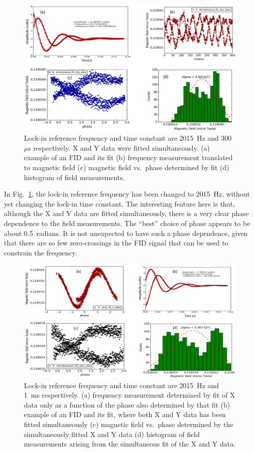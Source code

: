 \begin{figure}%
\centering\includegraphics[width=0.8\linewidth]{figures/freq_2015_simultaneous_fit_300microsec.png}
\caption{Lock-in reference frequency and time constant are 2015~Hz and
  300~$\mu$s respectively.  X and Y data were fitted simultaneously.
  (a) example of an FID and its fit (b) frequency measurement
  translated to magnetic field (c) magnetic field vs.~phase determined
  by fit (d) histogram of field
  measurements.\label{fig:freq_2015_simultaneous_fit_300_micros}}
\end{figure}

In Fig.~\ref{fig:freq_2015_simultaneous_fit_300_micros}, the lock-in
reference frequency has been changed to 2015~Hz, without yet changing
the lock-in time constant.  The interesting feature here is that,
although the X and Y data are fitted simultaneously, there is a very
clear phase dependence to the field measurements.  The ``best'' choice
of phase appears to be about 0.5~radians.  It is not unexpected to
have such a phase dependence, given that there are so few
zero-crossings in the FID signal that can be used to constrain the
frequency.

\begin{figure}%
\centering\includegraphics[width=0.8\linewidth]{figures/freq_2015_simultaneous_fit_1ms.png}
\caption{Lock-in reference frequency and time constant are 2015~Hz and
  1~ms respectively.  (a) frequency measurement determined by fit of X
  data only as a function of the phase also determined by that fit (b)
  example of an FID and its fit, where both X and Y data has been
  fitted simultaneously (c) magnetic field vs.~phase determined by the
  simultaneously fitted X and Y data (d) histogram of field
  measurements arising from the simultaneous fit of the X and Y
  data.\label{fig:freq_2015_1ms}}
\end{figure}

